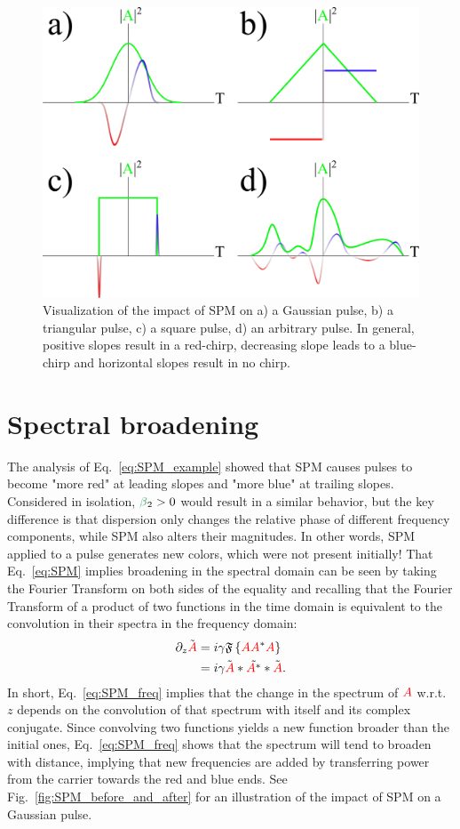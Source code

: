 \begin{figure}
    \centering
    \includegraphics[width=0.75\linewidth]{figures/SPM_chirp.png}
    \caption{Visualization of the impact of SPM on a) a Gaussian pulse, b) a triangular pulse, c) a square pulse, d) an arbitrary pulse. In general, positive slopes result in a red-chirp, decreasing slope leads to a blue-chirp and horizontal slopes result in no chirp.   }
    \label{fig:chirp_profiles}
\end{figure}


\section{Spectral broadening}
The analysis of Eq.~\ref{eq:SPM_example} showed that SPM causes pulses to become "more red" at leading slopes and "more blue" at trailing slopes. Considered in isolation, $\betag_2>0$ would result in a similar behavior, but the key difference is that dispersion only changes the relative phase of different frequency components, while SPM also alters their magnitudes. In other words, SPM applied to a pulse generates new colors, which were not present initially! That Eq.~\ref{eq:SPM} implies broadening in the spectral domain can be seen by taking the Fourier Transform on both sides of the equality and recalling that the Fourier Transform of a product of two functions in the time domain is equivalent to the convolution in their spectra in the frequency domain:
\begin{align}
\label{eq:SPM_freq}
    \partial_z\Tilde{\textcolor{red}{A}} &= i\gamma \mathfrak{F}\left\{\textcolor{red}{A}\textcolor{red}{A}^*\textcolor{red}{A}\right\} \\ \nonumber
    &= i\gamma \Tilde{\textcolor{red}{A}}*\Tilde{\textcolor{red}{A}^*}*\Tilde{\textcolor{red}{A}}.
\end{align}
In short, Eq.~\ref{eq:SPM_freq} implies that the change in the spectrum of $\textcolor{red}{A}$ w.r.t. $z$ depends on the convolution of that spectrum with itself and its complex conjugate. Since convolving two functions yields a new function broader than the initial ones, Eq.~\ref{eq:SPM_freq} shows that the spectrum will tend to broaden with distance, implying that new frequencies are added by transferring power from the carrier towards the red and blue ends. See Fig.~\ref{fig:SPM_before_and_after} for an illustration of the impact of SPM on a Gaussian pulse.

